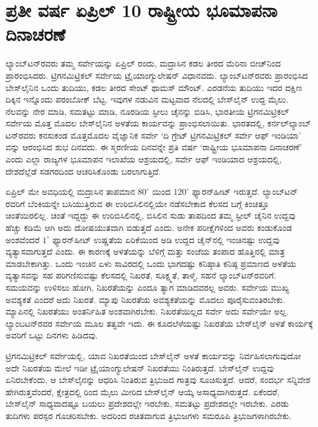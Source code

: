 
\chapter{ಪ್ರತೀ ವರ್ಷ ಏಪ್ರಿಲ್​ 10 ರಾಷ್ಟ್ರೀಯ ಭೂಮಾಪನಾ ದಿನಾಚರಣೆ}

ಲ್ಯಾಂಬ್​ಟನ್​ರವರು ತಮ್ಮ ಸರ್ವೇಯನ್ನು  ಏಪ್ರಿಲ್​  ರಂದು, ಮದ್ರಾಸಿನ ಕಡಲ ತೀರದ ಮೆರಿನಾ ಬೀಚ್​ನಿಂದ ಪ್ರಾರಂಭಿಸಿದರು. ಟ್ರಿಗನಮಿಟ್ರಿಕಲ್​ ಸರ್ವೇಯ ಟ್ರೈಯಾಂಗ್ಯುಲೇಷನ್​ ವಿಧಾನವದು. ಲ್ಯಾಂಬ್​ಟನ್​ರವರು ಪ್ರಾರಂಭಿಸಿದ ಬೇಸ್​ಲೈನಿನ ಒಂದು ತುದಿಯು, ಕಡಲ ತೀರದ ಸೇಂಟ್​ ಥಾಮಸ್​ ಮೌಂಟ್​. ಎರಡನೆಯ ತುದಿಯು ಇದರ ದಕ್ಷಿಣ ದಿಕ್ಕಿನ ಇನ್ನೊಂದು ಪರಂಬೋಕ್​ ಬೆಟ್ಟ. ಇವುಗಳ ನಡುವಿನ ಮಟ್ಟವಾದ ನೆಲದಲ್ಲಿ ಬೇಸ್​ಲೈನ್​ ಉದ್ದ  ಮೈಲು. ನೆಲವನ್ನು ನೇರ ಮಾಡಿ, ಸಮತಟ್ಟು ಮಾಡಿ, ನೂರಡಿಯ ಸ್ಟೀಲು ಚೈನನ್ನು ಬಿಡಿಸಿ, ಭಾರತೀಯ ಟ್ರಿಗನಮಿಟ್ರಿಕಲ್​ ಸರ್ವೇಯ ಮೊತ್ತ ಮೊದಲ ಬೇಸ್​ಲೈನಿನ ಅಳತೆಯ ಕಾರ್ಯವನ್ನು ಪ್ರಾಂಭಿಸಲಾಯಿತು. ಭಾರತದಲ್ಲಿ, ಕರ್ನಲ್​\break ಲ್ಯಾಂಬ್​ಟನ್​ರವರು ಕನಸುಕಂಡ ಮೊತ್ತಮೊದಲ ವೈಜ್ಞಾನಿಕ ಸರ್ವೇ ‘ದಿ ಗ್ರೇಟ್\break ​ ಟ್ರಿಗನಮಿಟ್ರಿಕಲ್​ ಸರ್ವೇ ಆಫ್​ ಇಂಡಿಯಾ’ ವನ್ನು ಆರಂಭಿಸಿದ ಶುಭ ದಿನವದು. ಈ ಸ್ಮರಣೀಯ ದಿನವನ್ನೇ ಪ್ರತಿ ವರ್ಷ ‘ರಾಷ್ಟ್ರೀಯ ಭೂಮಾಪನಾ ದಿನಾಚರಣೆ’ ಎಂದು ಎಲ್ಲಾ ರಾಜ್ಯಗಳ ಭೂಮಾಪನ ಇಲಾಖೆಯ ಆಶ್ರಯದಲ್ಲಿ, ಸರ್ವೇ ಆಫ್​ ಇಂಡಿಯಾದ ಆಶ್ರಯದಲ್ಲಿ, ದೇಶದೆಲ್ಲೆಡೆ ಸಡಗರದಿಂದ ಆಚರಿಸಿಕೊಂಡು ಬರಲಾಗುತ್ತಿದೆ.

ಏಪ್ರಿಲ್​ ಮೇ ಅವಧಿಯಲ್ಲಿ ಮದ್ರಾಸಿನ ತಾಪಮಾನ $80^\circ$ ಯಿಂದ $120^\circ$ ಫ್ಯಾರನ್​\break ಹೀಟ್​ ಇರುತ್ತದೆ. ಲ್ಯಾಂಬ್​ಟನ್​ರವರಿಗೆ ಬೆಂಕಿಯನ್ನೇ ಬಸಿಯುತ್ತಿರುವ ಈ ಉರಿಬಿಸಿಲಿನಲ್ಲಿಯೇ ನಡೆಸಬೇಕಾದ ಕೆಲಸದ ಬಗ್ಗೆ ಕಿಂಚಿತ್ತೂ ಚಿಂತೆಯಿರಲಿಲ್ಲ. ಚಿಂತೆ ಇದ್ದದ್ದು ಈ ಉರಿಬಿಸಿಲಿನಲ್ಲಿ, ಬಿಸಿಲಿನ ಸುಡು ತಾಪದಿಂದ ತಮ್ಮ ಸ್ಟೀಲ್​ ಚೈನಿನ ಉದ್ದವು ಹೆಚ್ಚು ಕಡಿಮೆ ಆಗಿ ಅದು ದೋಷಯುತವಾಗಿ ಬಿಡುತ್ತದೆ ಎಂದು. ಅನೇಕ ಪರೀಕ್ಷೆಗಳಿಂದ ಅವರು ಕಂಡುಕೊಂಡ ಅಂಶವೆಂದರೆ $1^\circ$ ಫ್ಯಾರನ್​ಹೀಟ್​ ಉಷ್ಣತೆಯ ಏರಿಕೆಯಿಂದ  ಅಡಿ ಉದ್ದದ ಚೈನ್​ನಲ್ಲಿ  ಇಂಚಿನಷ್ಟು ಉದ್ದವು ವ್ಯತ್ಯಾಸವಾಗುತ್ತದೆ ಎಂದು. ಈ ಕಾರಣಕ್ಕೆ ಅಳತೆಯನ್ನು ಬೆಳಿಗ್ಗೆ ಮತ್ತು ಸಂಜೆಯ ತಂಪಾದ ಹೊತ್ತಿನಲ್ಲಿ ಮಾತ್ರ ಮಾಡಬೇಕಾಗಿತ್ತು. ಒಂದು ಇಂಚಿನ ಏಳು ಸಾವಿರದಲ್ಲಿ ಒಂದು ಭಾಗದಷ್ಟು ಕನಿಷ್ಠಾತಿ ಕನಿಷ್ಠ ಪ್ರಮಾಣದ ಅಳತೆಯ ವ್ಯತ್ಯಾಸವನ್ನು ಸಹ ಪರಿಗಣಿಸುವಷ್ಟು ಕೆಲಸದಲ್ಲಿ ನಿಖರತೆ, ಸೂಕ್ಷ್ಮತೆ, ತಾಳ್ಮೆ, ಸಹನೆ ಲ್ಯಾಂಬ್​ಟನ್​ರವರಿಗೆ. ಸಮಯವನ್ನು ಉಳಿಸಲು ಹೋಗಿ, ನಿಖರತೆಯನ್ನು ಎಂದೂ ತ್ಯಾಗ ಮಾಡಿದವರಲ್ಲ ಅವರು. ಸರ್ವೇಯ ಮುಖ್ಯ ಅವಶ್ಯಕತೆ ಎಂದರೆ ಅದು ನಿಖರತೆ. ಮ್ಯಾಪು ನಿಖರತೆಯ ಅವಶ್ಯಕತೆಯನ್ನು ಮೊದಲು ಪೂರೈಸುವಂತಿರಬೇಕು. ಮ್ಯಾಪಿನಲ್ಲಿ ನಿಖರತೆಯು ಅಂತರ್ನಿಹಿತ ಅಂಶವಾಗಿರಬೇಕು. ನಿಖರತೆಯಿಲ್ಲದ ಸರ್ವೇ ಅದು ಸರ್ವೇಯೇ ಅಲ್ಲ. ಲ್ಯಾಂಬಟನ್​ರವರ ಸರ್ವೇಯ ಮೂಲ ತತ್ವವೇ ಇದು. ಈ ಕೂದಲೆಳೆಯಷ್ಟು ನಿಖರತೆಯ ಬೇಸ್​ಲೈನ್​ ಅಳತೆ ಕಾರ್ಯಕ್ಕೆ ಅವರಿಗೆ ಒಟ್ಟು  ದಿನಗಳು ಹಿಡಿದವು.

ಟ್ರಿಗನಮಿಟ್ರಿಕಲ್​ ಸರ್ವೇಯಲ್ಲಿ, ಯಾವ ನಿಖರತೆಯಿಂದ ಬೇಸ್‌ಲೈನ್​ ಅಳತೆ ಕಾರ್ಯವನ್ನು ನಿರ್ವಹಿಸಲಾಗುವುದೋ ಅದೇ ನಿಖರತೆಯ ಮೇಲೆ ಇಡೀ ಟ್ರೈಯಾಂಗ್ಯುಲೇಷನ್​ ನಿಖರತೆಯು ನಿಂತಿರುತ್ತದೆ. ಬೇಸ್‌ಲೈನ್​ ಉದ್ದವು ಏನಿರಬೇಕೆಂದು, ಆ ಬೇಸ್‌ಲೈನನ್ನು ಆಧರಿಸಿ ನಿಂತಿರುವ ತ್ರಿಭುಜದ ಗಾತ್ರವು ಸೂಚಿಸುತ್ತದೆ. ಆದರೆ, ಸಂದರ್ಭ ಸನ್ನಿವೇಶ ಹೇಗಿರುತ್ತವೆಂದರೆ, ಕ್ಷೇತ್ರದಲ್ಲಿ  ರಿಂದ  ಮೈಲು ಮೀರಿದ ಬೇಸ್‌ಲೈನ್​ ಆಯ್ಕೆ ಅಸಾಧ್ಯವಾಗಿರುತ್ತದೆ. ಏಕೆಂದರೆ, ಬೇಸ್‌ಲೈನ್​ ಸಾಧ್ಯವಾದಷ್ಟೂ ಬಯಲು ಪ್ರದೇಶದಲ್ಲೇ ಇರಬೇಕು, ಸಮತಟ್ಟು ಪ್ರದೇಶದಲ್ಲೇ ಇರಬೇಕು. ಎರಡು ತುದಿಗಳು ಪರಸ್ಪರ ಗೊಚರಿಸಬೇಕು. ಅದರಿಂದ ರಚಿತವಾಗುವ ತ್ರಿಭುಜಗಳು ಸಮರೂಪಿ ತ್ರಿಭುಜಗಳಾಗಿರಬೇಕು.

